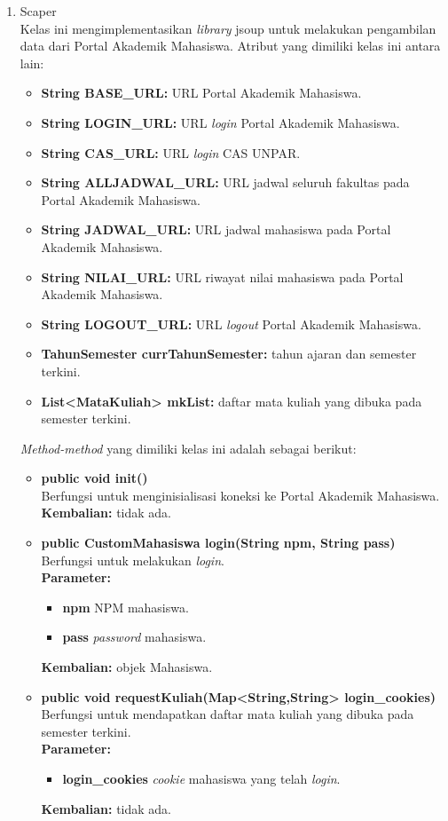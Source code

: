 \begin{enumerate}
		\item Scaper\\
		Kelas ini mengimplementasikan \textit{library} jsoup untuk melakukan pengambilan data dari Portal Akademik Mahasiswa. Atribut yang dimiliki kelas ini antara lain:
		\begin{itemize}
			\item \textbf{String BASE\_URL:} URL Portal Akademik Mahasiswa.
			\item \textbf{String LOGIN\_URL:} URL \textit{login} Portal Akademik Mahasiswa.
			\item \textbf{String CAS\_URL:} URL \textit{login} CAS UNPAR.
			\item \textbf{String ALLJADWAL\_URL:} URL jadwal seluruh fakultas pada Portal Akademik Mahasiswa.
			\item \textbf{String JADWAL\_URL:} URL jadwal mahasiswa pada Portal Akademik Mahasiswa.
			\item \textbf{String NILAI\_URL:} URL riwayat nilai mahasiswa pada Portal Akademik Mahasiswa.
			\item \textbf{String LOGOUT\_URL:} URL \textit{logout} Portal Akademik Mahasiswa.
			\item \textbf{TahunSemester currTahunSemester:} tahun ajaran dan semester terkini.
			\item \textbf{List<MataKuliah> mkList:} daftar mata kuliah yang dibuka pada semester terkini.
		\end{itemize}
	\textit{Method-method} yang dimiliki kelas ini adalah sebagai berikut:
		\begin{itemize}
			\item \textbf{public void init()}\\
			Berfungsi untuk menginisialisasi koneksi ke Portal Akademik Mahasiswa.\\
			\textbf{Kembalian:} tidak ada.
			
			\item \textbf{public CustomMahasiswa login(String npm, String pass)}\\
				Berfungsi untuk melakukan \textit{login}.\\
				\textbf{Parameter:}
				\begin{itemize}
					\item \textbf{npm} NPM mahasiswa.
					\item \textbf{pass} \textit{password} mahasiswa.
				\end{itemize}
				\textbf{Kembalian:} objek Mahasiswa.

			\item \textbf{public void requestKuliah(Map<String,String> login\_cookies)}\\
				Berfungsi untuk mendapatkan daftar mata kuliah yang dibuka pada semester terkini.\\
				\textbf{Parameter:}
				\begin{itemize}
					\item \textbf{login\_cookies} \textit{cookie} mahasiswa yang telah \textit{login}.
				\end{itemize}
				\textbf{Kembalian:} tidak ada.
				

\end{itemize}
\end{enumerate}
